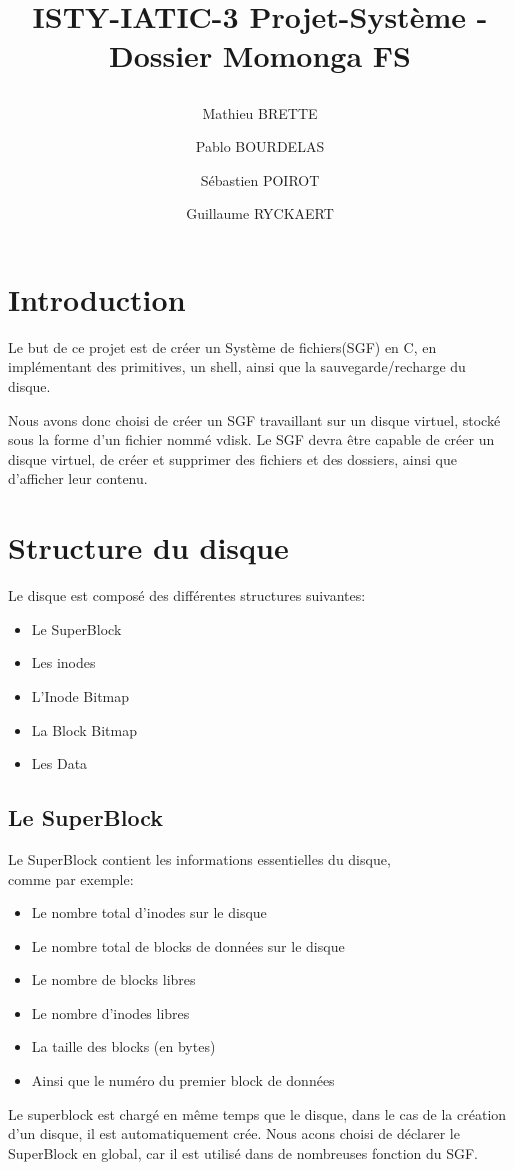\documentclass{report}
\begin{document}
\onehalfspacing
\title{%
    \begin{minipage}\linewidth
        \centering
        ISTY-IATIC-3
        \vskip 3pt
        \large Projet-Système - Dossier Momonga FS
    \author{Mathieu BRETTE \and Pablo BOURDELAS \and Sébastien POIROT\and Guillaume RYCKAERT}
    \end{minipage}
 }
 \maketitle

 \section*{Introduction}

 Le but de ce projet est de créer un Système de fichiers(SGF) en C, en implémentant des primitives, un shell, ainsi que la sauvegarde/recharge du disque.

Nous avons donc choisi de créer un SGF travaillant sur un disque virtuel, stocké sous la forme d'un fichier nommé vdisk. Le SGF devra être capable de créer un disque virtuel, de créer et supprimer des fichiers et des dossiers, ainsi que d'afficher leur contenu.
\newpage

\section*{Structure du disque}
Le disque est composé des différentes structures suivantes:
\begin{itemize}
\item Le SuperBlock
\item Les inodes
\item L'Inode Bitmap
\item La Block Bitmap
\item Les Data
\end{itemize}

\subsection*{Le SuperBlock}
Le SuperBlock contient les informations essentielles du disque,\\comme par exemple: 
\begin{itemize}
\item Le nombre total d'inodes sur le disque
\item Le nombre total de blocks de données sur le disque
\item Le nombre de blocks libres
\item Le nombre d'inodes libres
\item La taille des blocks (en bytes)
\item Ainsi que le numéro du premier block de données
\end{itemize}
Le superblock est chargé en même temps que le disque, dans le cas de la création d'un disque, il est automatiquement crée. Nous acons choisi de déclarer le SuperBlock en global, car il est utilisé dans de nombreuses fonction du SGF.
\end{document}
